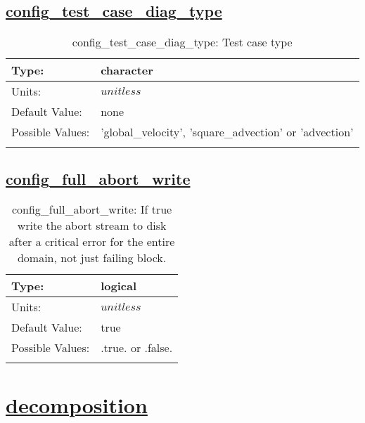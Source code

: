 \subsection[config\_test\_case\_diag\_type]{\hyperref[sec:nm_tab_io]{config\_test\_case\_diag\_type}}
\label{subsec:nm_sec_config_test_case_diag_type}
\begin{center}
\begin{longtable}{| p{2.0in} || p{4.0in} |}
    \hline
    Type: & character \\
    \hline
    Units: & $unitless$ \\
    \hline
    Default Value: & none \\
    \hline
    Possible Values: & 'global\_velocity', 'square\_advection' or 'advection' \\
    \hline
    \caption{config\_test\_case\_diag\_type: Test case type}
\end{longtable}
\end{center}
\subsection[config\_full\_abort\_write]{\hyperref[sec:nm_tab_io]{config\_full\_abort\_write}}
\label{subsec:nm_sec_config_full_abort_write}
\begin{center}
\begin{longtable}{| p{2.0in} || p{4.0in} |}
    \hline
    Type: & logical \\
    \hline
    Units: & $unitless$ \\
    \hline
    Default Value: & true \\
    \hline
    Possible Values: & .true. or .false. \\
    \hline
    \caption{config\_full\_abort\_write: If true write the abort stream to disk after a critical error for the entire domain, not just failing block.}
\end{longtable}
\end{center}
\section[decomposition]{\hyperref[sec:nm_tab_decomposition]{decomposition}}
\label{sec:nm_sec_decomposition}
